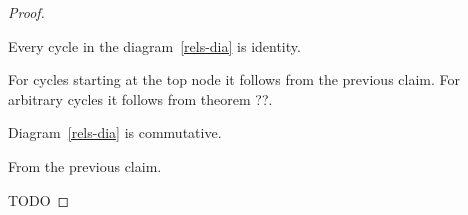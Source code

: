 \begin{proof}
\begin{claim}
Every cycle in the diagram~\ref{rels-dia} is identity.
\end{claim}
\begin{claimproof}
For cycles starting at the top node it follows from the previous claim.
For arbitrary cycles it follows from theorem ??.
\end{claimproof}

\begin{claim}
Diagram~\ref{rels-dia} is commutative.
\end{claim}
\begin{claimproof}
From the previous claim.
\end{claimproof}


TODO
\end{proof}